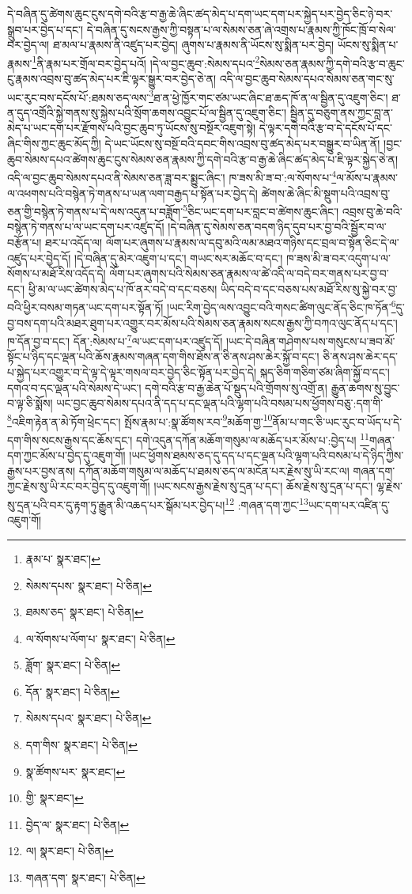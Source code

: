 དེ་བཞིན་དུ་ཚེགས་ཆུང་ངུས་དགེ་བའི་རྩ་བ་རྒྱ་ཆེ་ཞིང་ཚད་མེད་པ་དག་ཡང་དག་པར་སྐྱེད་པར་བྱེད་ཅིང་ཉེ་བར་སྒྲུབ་པར་བྱེད་པ་དང་། དེ་བཞིན་དུ་སངས་རྒྱས་ཀྱི་བསྟན་པ་ལ་སེམས་ཅན་ཞེ་འགྲས་པ་རྣམས་ཀྱི་ཁོང་ཁྲོ་བ་སེལ་བར་བྱེད་ལ། ཐ་མལ་པ་རྣམས་ནི་འཛུད་པར་བྱེད། ཞུགས་པ་རྣམས་ནི་ཡོངས་སུ་སྨིན་པར་བྱེད། ཡོངས་སུ་སྨིན་པ་རྣམས་\footnote{རྣམ་པ་  སྣར་ཐང་། }ནི་རྣམ་པར་གྲོལ་བར་བྱེད་པའོ། །དེ་ལ་བྱང་ཆུབ་:སེམས་དཔའ་\footnote{སེམས་དཔས་  སྣར་ཐང་།  པེ་ཅིན། }སེམས་ཅན་རྣམས་ཀྱི་དགེ་བའི་རྩ་བ་ཆུང་ངུ་རྣམས་འབྲས་བུ་ཚད་མེད་པར་ཇི་ལྟར་སྒྱུར་བར་བྱེད་ཅེ་ན། འདི་ལ་བྱང་ཆུབ་སེམས་དཔའ་སེམས་ཅན་གང་སུ་ཡང་རུང་བས་དངོས་པོ་:ཐམས་ཅད་ལས་\footnote{ཐམས་ཅད་  སྣར་ཐང་།  པེ་ཅིན། }ཐ་ན་ཕྱེ་ཁྱོར་གང་ཙམ་ཡང་ཞིང་ཐ་ཆད་ཁོ་ན་ལ་སྦྱིན་དུ་འཇུག་ཅིང་། ཐ་ན་དུད་འགྲོའི་སྐྱེ་གནས་སུ་སྐྱེས་པའི་སྲོག་ཆགས་འབྱུང་པོ་ལ་སྦྱིན་དུ་འཇུག་ཅིང་། སྦྱིན་དུ་བཅུག་ནས་ཀྱང་བླ་ན་མེད་པ་ཡང་དག་པར་རྫོགས་པའི་བྱང་ཆུབ་ཏུ་ཡོངས་སུ་བསྔོར་འཇུག་སྟེ། དེ་ལྟར་དགེ་བའི་རྩ་བ་དེ་དངོས་པོ་དང་ཞིང་གིས་ཀྱང་ཆུང་མོད་ཀྱི། དེ་ཡང་ཡོངས་སུ་བསྔོ་བའི་དབང་གིས་འབྲས་བུ་ཚད་མེད་པར་བསྒྱུར་བ་ཡིན་ནོ། །བྱང་ཆུབ་སེམས་དཔའ་ཚེགས་ཆུང་ངུས་སེམས་ཅན་རྣམས་ཀྱི་དགེ་བའི་རྩ་བ་རྒྱ་ཆེ་ཞིང་ཚད་མེད་པ་ཇི་ལྟར་སྐྱེད་ཅེ་ན། འདི་ལ་བྱང་ཆུབ་སེམས་དཔའ་ནི་སེམས་ཅན་ཟླ་བར་སྨྱུང་ཞིང་། ཁ་ཟས་མི་ཟ་བ་:ལ་སོགས་པ་\footnote{ལ་སོགས་པ་ལོག་པ་  སྣར་ཐང་།  པེ་ཅིན། }ལ་མོས་པ་རྣམས་ལ་འཕགས་པའི་བསྙེན་ཏེ་གནས་པ་ཡན་ལག་བརྒྱད་པ་སྟོན་པར་བྱེད་དེ། ཚེགས་ཆེ་ཞིང་མི་སྡུག་པའི་འབྲས་བུ་ཅན་གྱི་བསྙེན་ཏེ་གནས་པ་དེ་ལས་འདུན་པ་བཟློག་\footnote{ཟློག་  སྣར་ཐང་།  པེ་ཅིན། }ཅིང་ཡང་དག་པར་བླང་བ་ཚེགས་ཆུང་ཞིང་། འབྲས་བུ་ཆེ་བའི་བསྙེན་ཏེ་གནས་པ་ལ་ཡང་དག་པར་འཛུད་དོ། །དེ་བཞིན་དུ་སེམས་ཅན་བདག་ཉིད་དུབ་པར་བྱ་བའི་སྦྱོར་བ་ལ་བརྩོན་པ། ཐར་པ་འདོད་ལ། ལོག་པར་ཞུགས་པ་རྣམས་ལ་དབུ་མའི་ལམ་མཐའ་གཉིས་དང་བྲལ་བ་སྟོན་ཅིང་དེ་ལ་འཛུད་པར་བྱེད་དོ། །དེ་བཞིན་དུ་མེར་འཇུག་པ་དང་། གཡང་སར་མཆོང་བ་དང་། ཁ་ཟས་མི་ཟ་བར་འདུག་པ་ལ་སོགས་པ་མཐོ་རིས་འདོད་དེ། ལོག་པར་ཞུགས་པའི་སེམས་ཅན་རྣམས་ལ་ཚེ་འདི་ལ་བདེ་བར་གནས་པར་བྱ་བ་དང་། ཕྱི་མ་ལ་ཡང་ཚེགས་མེད་པ་ཁོ་ནར་བདེ་བ་དང་བཅས། ཡིད་བདེ་བ་དང་བཅས་པས་མཐོ་རིས་སུ་སྐྱེ་བར་བྱ་བའི་ཕྱིར་བསམ་གཏན་ཡང་དག་པར་སྟོན་ཏོ། །ཡང་རིག་བྱེད་ལས་འབྱུང་བའི་གསང་ཚིག་ལུང་ནོད་ཅིང་ཁ་ཏོན་\footnote{དོན་  སྣར་ཐང་།  པེ་ཅིན། }དུ་བྱ་བས་དག་པའི་མཐར་ཐུག་པར་འགྱུར་བར་མོས་པའི་སེམས་ཅན་རྣམས་སངས་རྒྱས་ཀྱི་བཀའ་ལུང་ནོད་པ་དང་། ཁ་དོན་བྱ་བ་དང་། དོན་:སེམས་པ་\footnote{སེམས་དཔའ་  སྣར་ཐང་།  པེ་ཅིན། }ལ་ཡང་དག་པར་འཛུད་དོ། །ཡང་དེ་བཞིན་གཤེགས་པས་གསུངས་པ་ཟབ་མོ་སྟོང་པ་ཉིད་དང་ལྡན་པའི་ཆོས་རྣམས་གཞན་དག་གིས་ཐོས་ན་ཅི་ནས་ཤས་ཆེར་སྐྱོ་བ་དང་། ཅི་ནས་ཤས་ཆེར་དད་པ་སྐྱེད་པར་འགྱུར་བ་དེ་ལྟ་དེ་ལྟར་གསལ་བར་བྱེད་ཅིང་སྟོན་པར་བྱེད་དེ། སྐད་ཅིག་གཅིག་ཙམ་ཞིག་སྐྱོ་བ་དང་། དགའ་བ་དང་ལྡན་པའི་སེམས་དེ་ཡང་། དགེ་བའི་རྩ་བ་རྒྱ་ཆེན་པོ་སྡུད་པའི་གྲོགས་སུ་འགྲོ་ན། རྒྱུན་ཆགས་སུ་བྱུང་བ་ལྟ་ཅི་སྨོས། ཡང་བྱང་ཆུབ་སེམས་དཔའ་ནི་དད་པ་དང་ལྡན་པའི་ལྷག་པའི་བསམ་པས་ཕྱོགས་བཅུ་:དག་གི་\footnote{དག་གིས་  སྣར་ཐང་།  པེ་ཅིན། }འཇིག་རྟེན་ན་མེ་ཏོག་ཕྲེང་དང་། སྤོས་རྣམ་པ་:སྣ་ཚོགས་རབ་\footnote{སྣ་ཚོགས་པར་  སྣར་ཐང་། }མཆོག་གྱ་\footnote{གྱི་  སྣར་ཐང་། }ནོམ་པ་གང་ཅི་ཡང་རུང་བ་ཡོད་པ་དེ་དག་གིས་སངས་རྒྱས་དང་ཆོས་དང་། དགེ་འདུན་དཀོན་མཆོག་གསུམ་ལ་མཆོད་པར་མོས་པ་:བྱེད་པ། \footnote{བྱེད་ལ་  སྣར་ཐང་།  པེ་ཅིན། }གཞན་དག་ཀྱང་མོས་པ་བྱེད་དུ་འཇུག་གོ། །ཡང་ཕྱོགས་ཐམས་ཅད་དུ་དད་པ་དང་ལྡན་པའི་ལྷག་པའི་བསམ་པ་དེ་ཉིད་ཀྱིས་རྒྱས་པར་བྱས་ནས། དཀོན་མཆོག་གསུམ་ལ་མཆོད་པ་ཐམས་ཅད་ལ་མངོན་པར་རྗེས་སུ་ཡི་རང་ལ། གཞན་དག་ཀྱང་རྗེས་སུ་ཡི་རང་བར་བྱེད་དུ་འཇུག་གོ། །ཡང་སངས་རྒྱས་རྗེས་སུ་དྲན་པ་དང་། ཆོས་རྗེས་སུ་དྲན་པ་དང་། ལྷ་རྗེས་སུ་དྲན་པའི་བར་དུ་རྟག་ཏུ་རྒྱུན་མི་འཆད་པར་སྒོམ་པར་བྱེད་པ།\footnote{ལ།  སྣར་ཐང་།  པེ་ཅིན། } :གཞན་དག་ཀྱང་\footnote{གཞན་དག་  སྣར་ཐང་།  པེ་ཅིན། }ཡང་དག་པར་འཛིན་དུ་འཇུག་གོ། 
